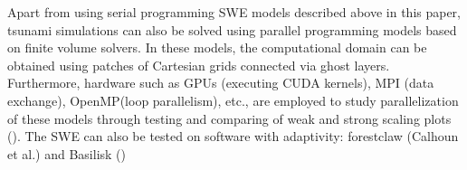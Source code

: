 \documentclass[10pt,a4paper]{article}
\begin{document}
Apart from using serial programming SWE models described above in this paper, tsunami simulations can also be solved using parallel programming models based on finite volume solvers.  In these models, the computational domain can be obtained using patches of Cartesian grids connected via ghost layers.  Furthermore, hardware such as GPUs (executing CUDA kernels), MPI (data exchange), OpenMP(loop parallelism), etc., are employed to study parallelization of these models through testing and comparing of weak and strong scaling plots (\cite{qi-le-mo:2018}).  The SWE can also be tested on software with adaptivity: forestclaw (Calhoun et al.) and  Basilisk (\cite{po:2015})


	
	
	
	
	
	
	
\end{document}
